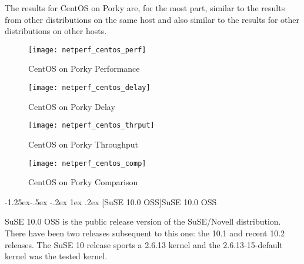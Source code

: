 \documentclass[letterpaper,final,notitlepage,twocolumn,10pt,twoside]{article}
\makeatletter
\renewcommand\subsubsection{\@startsection{subsubsection}{3}{\z@}%
                                     {-1.25ex\@plus -.5ex \@minus -.2ex}%
                                     {1ex \@plus .2ex}%
                                     {\normalfont\normalsize\bfseries}}
\makeatother
\begin{document}
The results for CentOS on Porky are, for the most part, similar to the results from other
distributions on the same host and also similar to the results for other distributions on other
hosts.

\begin{figure}[p]
\center\texttt{[image: netperf\_centos\_perf]}
\caption[CentOS on Porky Performance]{CentOS on Porky Performance}
\label{figure:centosperf}
\end{figure}

\begin{figure}[p]
\center\texttt{[image: netperf\_centos\_delay]}
\caption[CentOS on Porky Delay]{CentOS on Porky Delay}
\label{figure:centosdly}
\end{figure}

\begin{figure}[p]
\center\texttt{[image: netperf\_centos\_thrput]}
\caption[CentOS on Porky Throughput]{CentOS on Porky Throughput}
\label{figure:centosthrput}
\end{figure}

\begin{figure}[pt]
\center\texttt{[image: netperf\_centos\_comp]}
\caption[CentOS on Porky Comparison]{CentOS on Porky Comparison}
\label{figure:centoscomp}
\end{figure}

\subsubsection[SuSE 10.0 OSS]{SuSE 10.0 OSS}

SuSE 10.0 OSS is the public release version of the SuSE/Novell distribution.  There have been two
releases subsequent to this one: the 10.1 and recent 10.2 releases.  The SuSE 10 release sports a
2.6.13 kernel and the 2.6.13-15-default kernel was the tested kernel.
\end{document}
